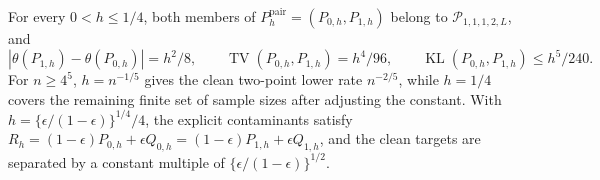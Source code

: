For every \(0<h\leq1/4\), both members of \(P_h^{\mathrm{pair}}=(P_{0,h},P_{1,h})\) belong to \(\mathcal P_{1,1,1,2,L}\), and
\[
 |\theta(P_{1,h})-\theta(P_{0,h})|=h^2/8,\qquad
 \operatorname{TV}(P_{0,h},P_{1,h})=h^4/96,\qquad
 \operatorname{KL}(P_{0,h},P_{1,h})\leq h^5/240.
\]
For \(n\geq4^5\), \(h=n^{-1/5}\) gives the clean two-point lower rate \(n^{-2/5}\), while \(h=1/4\) covers the remaining finite set of sample sizes after adjusting the constant.  With \(h=\{\epsilon/(1-\epsilon)\}^{1/4}/4\), the explicit contaminants satisfy \(R_h=(1-\epsilon)P_{0,h}+\epsilon Q_{0,h}=(1-\epsilon)P_{1,h}+\epsilon Q_{1,h}\), and the clean targets are separated by a constant multiple of \(\{\epsilon/(1-\epsilon)\}^{1/2}\).
